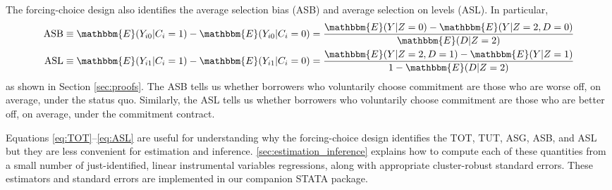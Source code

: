 \documentclass[12pt, a4paper]{article}
\begin{document}
The forcing-choice design also identifies the average selection bias (ASB) and average selection on levels (ASL). In particular,
\begin{align}
\label{eq:ASB}
    \text{ASB} &\equiv \mathbbm{E}(Y_{i0}|C_i=1) - \mathbbm{E}(Y_{i0}|C_i = 0) = \frac{\mathbbm{E}(Y|Z=0) - \mathbbm{E}(Y|Z=2,D=0)}{\mathbbm{E}(D|Z=2)}\\
    \label{eq:ASL}
    \text{ASL} &\equiv \mathbbm{E}(Y_{i1}|C_i = 1) - \mathbbm{E}(Y_{i1}|C_i=0) = \frac{\mathbbm{E}(Y|Z=2,D=1) - \mathbbm{E}(Y|Z=1)}{1 - \mathbbm{E}(D|Z=2)}
\end{align}
as shown in Section \ref{sec:proofs}.
The ASB tells us whether borrowers who voluntarily choose commitment are those who are worse off, on average, under the status quo.
Similarly, the ASL tells us whether borrowers who voluntarily choose commitment are those who are better off, on average, under the commitment contract.

Equations \eqref{eq:TOT}--\eqref{eq:ASL} are useful for understanding why the forcing-choice design identifies the TOT, TUT, ASG, ASB, and ASL but they are less convenient for estimation and inference. 
\autoref{sec:estimation_inference} explains how to compute each of these quantities from a small  number of just-identified, linear instrumental variables regressions, along with appropriate cluster-robust standard errors.
These estimators and standard errors are implemented in our companion STATA package. %





\end{document}
